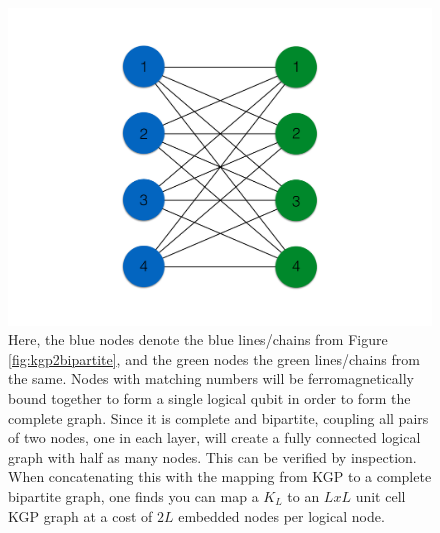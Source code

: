 \documentclass[superscriptaddress,showpacs,reprint]{revtex4-1}
\begin{document}
\begin{figure}[hbt]
  \includegraphics[width=\textwidth/2]{bipartitetofull}
  \caption{Here, the blue nodes denote the blue lines/chains from Figure \ref{fig:kgp2bipartite}, and the green nodes the green lines/chains from the same. Nodes with matching numbers will be ferromagnetically bound together to form a single logical qubit in order to form the complete graph. Since it is complete and bipartite, coupling all pairs of two nodes, one in each layer, will create a fully connected logical graph with half as many nodes. This can be verified by inspection. When concatenating this with the mapping from KGP to a complete bipartite graph, one finds you can map a $K_L$ to an $LxL$ unit cell KGP graph at a cost of $2L$ embedded nodes per logical node.}
  \label{fig:bipartite2full}
\end{figure}


\end{document}
